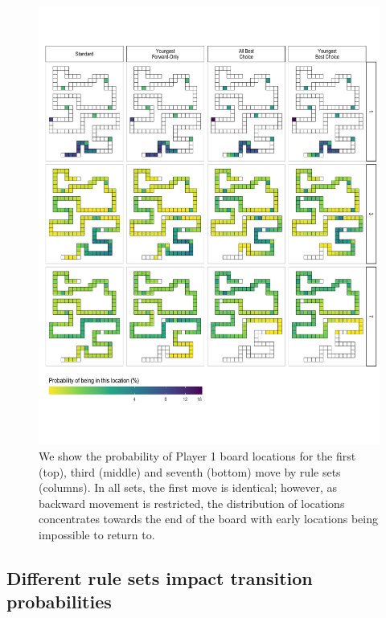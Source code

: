 \documentclass[letterpaper,9pt,twocolumn,twoside,]{pinp}
\begin{document}
\begin{figure}
  \begin{center}
    \includegraphics[width=6in]{./../../plots/p_positions_by_rules.pdf}
    \caption{We show the probability of Player 1 board locations for the first (top), third (middle) and seventh (bottom) move by rule sets (columns). In all sets, the first move is identical; however, as backward movement is restricted, the distribution of locations concentrates towards the end of the board with early locations being impossible to return to.}
    \label{fig:p_positions_by_rules}
  \end{center}
\end{figure}

\hypertarget{different-rule-sets-impact-transition-probabilities}{%
\subsection{Different rule sets impact transition
probabilities}\label{different-rule-sets-impact-transition-probabilities}}
\end{document}
